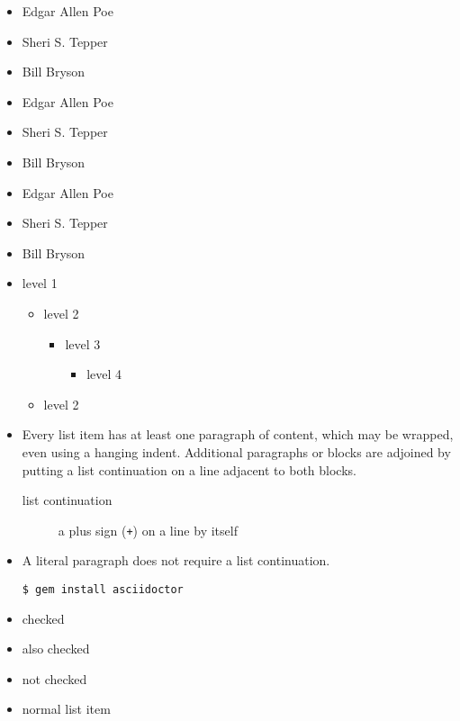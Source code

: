 \begin{itemize}
\item Edgar Allen Poe
\item Sheri S. Tepper
\item Bill Bryson
\end{itemize}

\begin{itemize}
\item Edgar Allen Poe
\item Sheri S. Tepper
\item Bill Bryson
\end{itemize}

\begin{itemize}
\item Edgar Allen Poe
\item Sheri S. Tepper
\item Bill Bryson
\end{itemize}

\begin{itemize}
\item level 1
\begin{itemize}
\item level 2
\begin{itemize}
\item level 3
\begin{itemize}
\item level 4
\end{itemize}
\end{itemize}
\item level 2
\end{itemize}
\end{itemize}

\begin{itemize}
\item Every list item has at least one paragraph of content,
which may be wrapped, even using a hanging indent.
Additional paragraphs or blocks are adjoined by putting
a list continuation on a line adjacent to both blocks.
\begin{description}
\item[list continuation]a plus sign ({\tt +}) on a line by itself
\end{description}
\item A literal paragraph does not require a list continuation.
\begin{verbatim}
$ gem install asciidoctor
\end{verbatim}
\end{itemize}

\begin{itemize}
\item checked
\item also checked
\item not checked
\item normal list item
\end{itemize}
